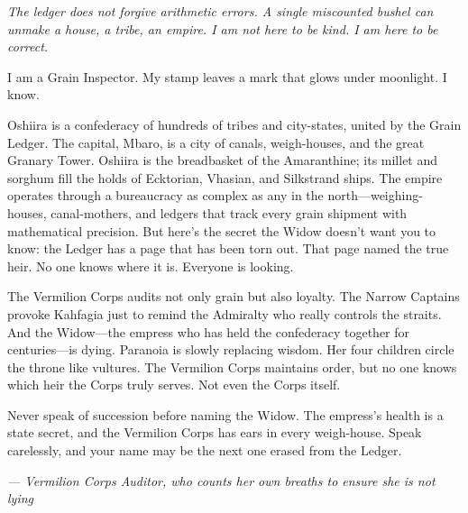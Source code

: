 \noindent
{\Large
\textit{The ledger does not forgive arithmetic errors. A single miscounted bushel can unmake a house, a tribe, an empire. I am not here to be kind. I am here to be correct.}

\vspace{0.5em}

I am a Grain Inspector. My stamp leaves a mark that glows under moonlight. I know.

\vspace{0.5em}

Oshiira is a confederacy of hundreds of tribes and city-states, united by the Grain Ledger. The capital, Mbaro, is a city of canals, weigh-houses, and the great Granary Tower. Oshiira is the breadbasket of the Amaranthine; its millet and sorghum fill the holds of Ecktorian, Vhasian, and Silkstrand ships. The empire operates through a bureaucracy as complex as any in the north---weighing-houses, canal-mothers, and ledgers that track every grain shipment with mathematical precision. But here's the secret the Widow doesn't want you to know: the Ledger has a page that has been torn out. That page named the true heir. No one knows where it is. Everyone is looking.

\vspace{0.5em}

The Vermilion Corps audits not only grain but also loyalty. The Narrow Captains provoke Kahfagia just to remind the Admiralty who really controls the straits. And the Widow---the empress who has held the confederacy together for centuries---is dying. Paranoia is slowly replacing wisdom. Her four children circle the throne like vultures. The Vermilion Corps maintains order, but no one knows which heir the Corps truly serves. Not even the Corps itself.

\vspace{0.5em}

Never speak of succession before naming the Widow. The empress's health is a state secret, and the Vermilion Corps has ears in every weigh-house. Speak carelessly, and your name may be the next one erased from the Ledger.

\vspace{1em}

\noindent\textit{--- Vermilion Corps Auditor, who counts her own breaths to ensure she is not lying}
}

\vspace{1em}

